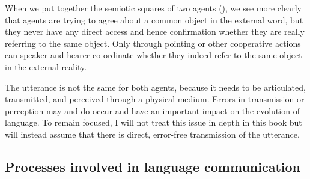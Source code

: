 When we put together the semiotic squares of two 
agents (), we see more clearly 
that agents are trying to agree about a common object
in the external word, but they never have 
any direct access and hence confirmation whether they 
are really referring to the same object. 
Only through pointing or other
cooperative actions can speaker and hearer co-ordinate
whether they indeed refer to the same object in
the external reality. 

The utterance is not the same for both agents, because it
needs to be articulated, transmitted, and perceived through 
a physical medium. Errors in transmission or perception may 
and do occur and have an important impact on the evolution of 
language. To remain focused, I will not treat this issue in depth in 
this book but will instead assume that there is direct, error-free transmission
of the utterance. 

\subsection{Processes involved in language communication}

